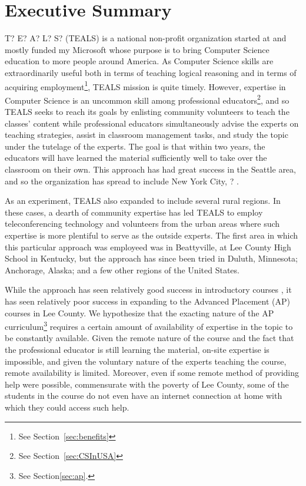 
\section{Executive Summary}

T? E? A? L? S? (TEALS) is a national non-profit organization started at and
mostly funded my Microsoft whose purpose is to bring Computer Science education
to more people around America. As Computer Science skills are extraordinarily
useful both in terms of teaching logical reasoning\autocite{????} and in terms of
acquiring employment\autocite{????}\footnote{See Section~\ref{sec:benefits}}, TEALS mission is quite timely. However,
expertise in Computer Science is an uncommon skill among professional educators\footnote{See Section~\ref{sec:CSInUSA}},
and so TEALS seeks to reach its goals by enlisting community volunteers to teach
the classes' content while professional educators simultaneously advise the
experts on teaching strategies, assist in classroom management tasks, and
study the topic under the tutelage of the experts. The goal is that within two
years, the educators will have learned the material sufficiently well to take
over the classroom on their own\autocite{TEALS Brochure?}. This approach has had great success in the Seattle area\autocite{Statistics?}, and
so the organization has spread to include New York City, ? \autocite{TEALS
Brochure?}.

As an experiment, TEALS also expanded to include several rural regions. In these
cases, a dearth of community expertise has led TEALS to employ teleconferencing
technology and volunteers from the urban areas where such expertise is more
plentiful to serve as the outside experts. The first area in which this
particular approach was employeed was in Beattyville, at Lee County High School
in Kentucky, but the approach has since been tried in Duluth, Minnesota;
Anchorage, Alaska; and a few other regions of the United States\autocite{some
public statistics about expansion}.

While the approach has seen relatively good success in introductory courses
\autocite{WoolyWormVideo}, it has seen relatively poor success in expanding to
the Advanced Placement (AP) courses in Lee County. We hypothesize that the
exacting nature of the AP curriculum\footnote{See Section\ref{sec:ap}.}
requires a certain amount of availability
of expertise in the topic to be constantly available. Given the remote nature of
the course and the fact that the professional educator is still learning the
material, on-site expertise is impossible, and given the voluntary nature of the
experts teaching the course, remote availability is limited. Moreover, even if
some remote method of providing help were possible, commensurate with the
poverty of Lee County, some of the students in the course do not even have an
internet connection at home with which they could access such help.

